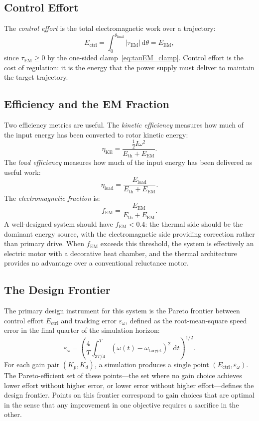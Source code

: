 \documentclass[11pt, a4paper]{article}
\theoremstyle{plain}
\theoremstyle{definition}
\newcommand{\dt}{\,\mathrm{d}t}
\newcommand{\tauEM}{\tau_{\mathrm{EM}}}
\newcommand{\Ethermal}{E_{\mathrm{th}}}
\newcommand{\EEM}{E_{\mathrm{EM}}}
\newcommand{\Eload}{E_{\mathrm{load}}}
\newcommand{\Ectrl}{E_{\mathrm{ctrl}}}
\newcommand{\KE}{\tfrac{1}{2}I\omega^{2}}
\newcommand{\om}{\omega}
\begin{document}
\subsection{Control Effort}

The \textit{control effort} is the total electromagnetic work over a trajectory:
\begin{equation}
  \Ectrl = \int_0^{\theta_{\mathrm{final}}} |\tauEM|\, \mathrm{d}\theta = \EEM,
\end{equation}
since $\tauEM \geq 0$ by the one-sided clamp~\eqref{eq:tauEM_clamp}. Control effort is the cost of regulation: it is the energy that the power supply must deliver to maintain the target trajectory.

\subsection{Efficiency and the EM Fraction}

Two efficiency metrics are useful. The \textit{kinetic efficiency} measures how much of the input energy has been converted to rotor kinetic energy:
\begin{equation}
  \eta_{\mathrm{KE}} = \frac{\KE}{\Ethermal + \EEM}.
\end{equation}
The \textit{load efficiency} measures how much of the input energy has been delivered as useful work:
\begin{equation}
  \eta_{\mathrm{load}} = \frac{\Eload}{\Ethermal + \EEM}.
\end{equation}
The \textit{electromagnetic fraction} is:
\begin{equation}
  f_{\mathrm{EM}} = \frac{\EEM}{\Ethermal + \EEM}.
\end{equation}
A well-designed system should have $f_{\mathrm{EM}} < 0.4$: the thermal side should be the dominant energy source, with the electromagnetic side providing correction rather than primary drive. When $f_{\mathrm{EM}}$ exceeds this threshold, the system is effectively an electric motor with a decorative heat chamber, and the thermal architecture provides no advantage over a conventional reluctance motor.

\subsection{The Design Frontier}

The primary design instrument for this system is the Pareto frontier between control effort $\Ectrl$ and tracking error $\varepsilon_\om$, defined as the root-mean-square speed error in the final quarter of the simulation horizon:
\begin{equation}
  \varepsilon_\om = \left(\frac{4}{T}\int_{3T/4}^{T} (\om(t) - \om_{\mathrm{target}})^2\, \dt\right)^{1/2}.
\end{equation}
For each gain pair $(K_p, K_d)$, a simulation produces a single point $(\Ectrl, \varepsilon_\om)$. The Pareto-efficient set of these points---the set where no gain choice achieves lower effort without higher error, or lower error without higher effort---defines the design frontier. Points on this frontier correspond to gain choices that are optimal in the sense that any improvement in one objective requires a sacrifice in the other.
\end{document}
